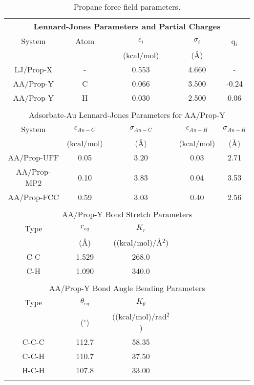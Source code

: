 \documentclass[10pt]{report}  %
\newcommand{\T}{\rule{0pt}{2.6ex}}
\newcommand{\B}{\rule[-1.2ex]{0pt}{0pt}}
\newcommand{\degree}{\ensuremath{^\circ}}
\begin{document}
%
%
\begin{table} []
\caption{Propane force field parameters.}
\centering
\begin{tabular}{ c  c  c  c  c}
\multicolumn{5}{c}{Lennard-Jones Parameters and Partial Charges} \\
    \hline 
System \T \B & Atom & $\epsilon_{i}$ & $\sigma_{i}$ & q$_{i}$ \\
 \T \B & & (kcal/mol) & (\AA) & \\
    \hline 
LJ/Prop-X \T \B & - & 0.553 & 4.660 & - \\
AA/Prop-Y \cite{Jorgensen:1996} \T \B & C & 0.066 & 3.500 & -0.24 \\
AA/Prop-Y \cite{Jorgensen:1996} \T \B & H & 0.030 & 2.500 & 0.06 \\
     \hline \\
\multicolumn{5}{c}{Adsorbate-Au Lennard-Jones Parameters for AA/Prop-Y} \\
	\hline
System \T \B & $\epsilon_{Au-C}$ & $\sigma_{Au-C}$ & $\epsilon_{Au-H}$ & $\sigma_{Au-H}$ \\
 \T \B & (kcal/mol) & (\AA) & (kcal/mol) & (\AA) \\
	\hline
AA/Prop-UFF \cite{Jorgensen:1996,Rappe:1992} \T \B & 0.05 & 3.20 & 0.03 & 2.71 \\
AA/Prop-MP2 \cite{Piana:2006} \T \B & 0.10 & 3.83 & 0.04 & 3.53  \\
AA/Prop-FCC \cite{Jorgensen:1996,Heinz:2008} \T \B & 0.59 & 3.03 & 0.40 & 2.56 \\
	\hline \\
	
\multicolumn{5}{c}{AA/Prop-Y Bond Stretch Parameters \cite{Jorgensen:1996}} \\
	\hline
Type \T \B & $r_{eq}$ & $K_r$ & &  \\
 \T \B & (\AA) & ((kcal/mol)/\AA$^2$) & &  \\
	\hline
C-C \T \B & 1.529 & 268.0  & &  \\
C-H \T \B & 1.090 & 340.0  & &  \\
	\hline \\ 
	
\multicolumn{5}{c}{AA/Prop-Y Bond Angle Bending Parameters \cite{Jorgensen:1996}} \\
	\hline
Type \T \B & $\theta_{eq}$ & $K_{\theta}$ & & \\
 \T \B & (\degree) & ((kcal/mol)/rad$^2$) & & \\
	\hline
C-C-C \T \B & 112.7 & 58.35  & & \\
C-C-H \T \B & 110.7 & 37.50  & & \\
H-C-H \T \B & 107.8 & 33.00  & & \\
	\hline \\ 
	

\end{tabular}
\end{table}
\end{document}
